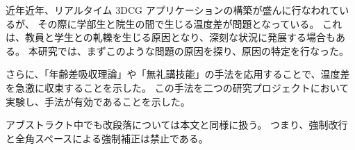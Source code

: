 近年近年、リアルタイム 3DCG アプリケーションの構築が盛んに行なわれているが、
その際に学部生と院生の間で生じる温度差が問題となっている。
これは、教員と学生との軋轢を生じる原因となり、深刻な状況に発展する場合もある。
本研究では、まずこのような問題の原因を探り、原因の特定を行なった。



さらに、「年齢差吸収理論」や「無礼講技能」の手法を応用することで、温度差を急激に収束することを示した。
この手法を二つの研究プロジェクトにおいて実験し、手法が有効であることを示した。

アブストラクト中でも改段落については本文と同様に扱う。
つまり、強制改行と全角スペースによる強制補正は禁止である。
